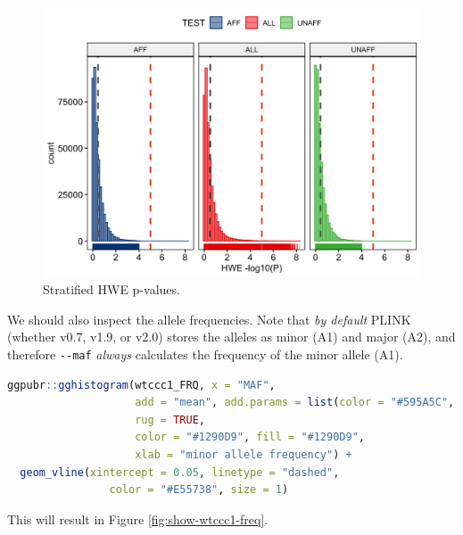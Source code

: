 \documentclass[
]{book}
\newcommand{\passthrough}[1]{#1}
\begin{document}
\begin{figure}

{\centering \includegraphics[width=18.67in]{img/_gwas/WTCCC1 HWE} 

}

\caption{Stratified HWE p-values.}\label{fig:show-wtccc1-hwe}
\end{figure}

We should also inspect the allele frequencies. Note that \emph{by default} PLINK (whether v0.7, v1.9, or v2.0) stores the alleles as minor (A1) and major (A2), and therefore \passthrough{\lstinline!--maf!} \emph{always} calculates the frequency of the minor allele (A1).

\begin{lstlisting}[language=R]
ggpubr::gghistogram(wtccc1_FRQ, x = "MAF",
                    add = "mean", add.params = list(color = "#595A5C", linetype = "dashed", size = 1),
                    rug = TRUE,
                    color = "#1290D9", fill = "#1290D9",
                    xlab = "minor allele frequency") +
  geom_vline(xintercept = 0.05, linetype = "dashed",
                color = "#E55738", size = 1)
\end{lstlisting}

This will result in Figure \ref{fig:show-wtccc1-freq}.
\end{document}

